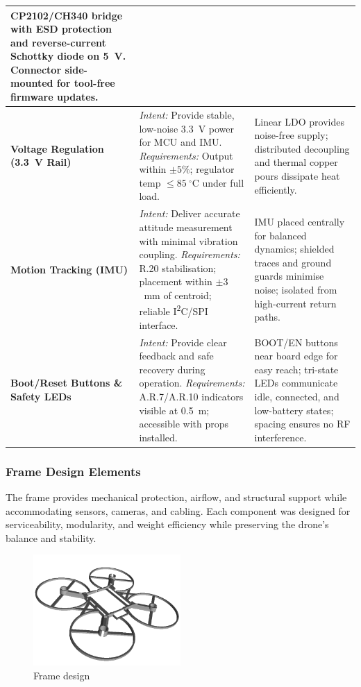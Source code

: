 \begin{longtable}{@{}p{2cm} p{6.9cm} p{6.9cm}@{}}
CP2102/CH340 bridge with ESD protection and reverse-current Schottky diode on 5~V. Connector side-mounted for tool-free firmware updates. \\ 
\midrule
\textbf{Voltage Regulation (3.3~V Rail)} &
\textit{Intent:} Provide stable, low-noise 3.3~V power for MCU and IMU. \newline
\textit{Requirements:} Output within $\pm5\%$; regulator temp $\leq 85~^{\circ}$C under full load. &
Linear LDO provides noise-free supply; distributed decoupling and thermal copper pours dissipate heat efficiently. \\ 
\midrule
\textbf{Motion Tracking (IMU)} &
\textit{Intent:} Deliver accurate attitude measurement with minimal vibration coupling. \newline
\textit{Requirements:} R.20 stabilisation; placement within $\pm3$~mm of centroid; reliable I\textsuperscript{2}C/SPI interface. &
IMU placed centrally for balanced dynamics; shielded traces and ground guards minimise noise; isolated from high-current return paths. \\ 
\midrule
\textbf{Boot/Reset Buttons \& Safety LEDs} &
\textit{Intent:} Provide clear feedback and safe recovery during operation. \newline
\textit{Requirements:} A.R.7/A.R.10 indicators visible at 0.5~m; accessible with props installed. &
BOOT/EN buttons near board edge for easy reach; tri-state LEDs communicate idle, connected, and low-battery states; spacing ensures no RF interference. \\ 
\bottomrule
\end{longtable}

\subsubsection{Frame Design Elements}

The frame provides mechanical protection, airflow, and structural support while accommodating sensors, cameras, and cabling. Each component was designed for serviceability, modularity, and weight efficiency while preserving the drone’s balance and stability.

\begin{figure}[H]
    \centering
    \captionsetup{justification=centering, margin=1cm}
    \includegraphics[width=0.5\textwidth]{img/main-frame.PNG}
    \caption{Frame design}
    \label{fig:frame}
\end{figure}


